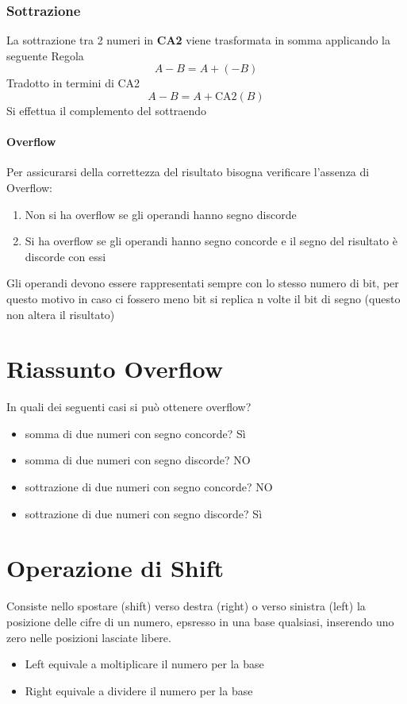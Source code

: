 \documentclass[12pt, a4paper, openany]{book}
\begin{document}
\subsubsection{Sottrazione}
La sottrazione tra 2 numeri in \textbf{CA2} viene trasformata in somma applicando la seguente Regola
\begin{equation}
    A-B=A+(-B)
\end{equation}
Tradotto in termini di CA2
\begin{equation}
    A-B=A+\mbox{CA}2(B)
\end{equation}
Si effettua il complemento del sottraendo
\paragraph{Overflow} Per assicurarsi della correttezza del risultato bisogna verificare l'assenza di 
Overflow:
\begin{enumerate}
    \item Non si ha overflow se gli operandi hanno segno discorde
    \item Si ha overflow se gli operandi hanno segno concorde e il segno del risultato è discorde con essi
\end{enumerate}
Gli operandi devono essere rappresentati sempre con lo stesso numero di bit, per questo motivo
in caso ci fossero meno bit si replica n volte il bit di segno (questo non altera il risultato)

\section{Riassunto Overflow}
In quali dei seguenti casi si può ottenere overflow?
\begin{itemize}
    \item somma di due numeri con segno concorde? Sì
    \item somma di due numeri con segno discorde? NO
    \item sottrazione di due numeri con segno concorde? NO
    \item sottrazione di due numeri con segno discorde? Sì
\end{itemize}
\section{Operazione di Shift}
Consiste nello spostare (shift) verso destra (right) o verso sinistra (left) la posizione delle cifre di un numero, epsresso in una base qualsiasi, inserendo uno zero
nelle posizioni lasciate libere.
\begin{itemize}
    \item Left equivale a moltiplicare il numero per la base
    \item Right equivale a dividere il numero per la base
\end{itemize}
\end{document}
